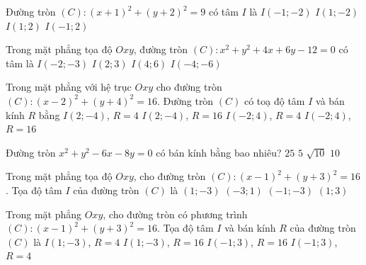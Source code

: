\begin{ex}%
	Đường  tròn $(C)\colon (x+1)^2+(y+2)^2=9$ có tâm $I$ là
	 \choice
		{\True  $I(-1;-2)$}
		 {$I(1;-2)$}
		 {$I(1; 2)$}
		{$I(-1;  2)$}
\end{ex}

\begin{ex}%
	Trong mặt phẳng tọa độ $Oxy$, đường tròn $(C) \colon x^2+y^2+4x+6y-12=0$ có tâm  là
	 \choice
		{\True  $I(-2;-3)$}
		{$I(2;3)$} 
		{$I(4;6)$} 
		 {$I(-4;-6)$}
\end{ex}

\begin{ex}%
	Trong mặt phẳng với hệ trục $Oxy$ cho đường tròn $(C)\colon  (x-2)^2 +(y+ 4)^2=16$. Đường tròn $(C)$ có toạ độ tâm $I$ và bán kính $R$ bằng
	\choice 
		 {\True $I(2;-4)$, $R=4$}
		{$I(2;-4)$, $R=16$} 
		 {$I(-2;4)$, $R=4$}
		 {$I(-2;4)$, $R=16$}
\end{ex}

\begin{ex}%
	Đường tròn $x^2+y^2-6 x-8 y=0$  có bán kính bằng bao nhiêu?
	\choice 
		{$ 25  $}
		 {\True $ 5 $}
		{$\sqrt{10}$} 
		 {$ 10 $}
\end{ex}

\begin{ex}%
	Trong mặt phẳng tọa độ $Oxy$, cho đường tròn $(C)\colon (x-1)^2+(y+3)^2=16$. Tọa độ tâm  $I$ của đường tròn $(C)$ là
	\choice 
		{\True $(1;-3)$} 
		{$(-3;1)$} 
		{$(-1;-3)$} 
		{$(1;3)$} 
\end{ex}

\begin{ex}%
	Trong mặt phẳng $Oxy$, cho  đường tròn có phương trình $(C)\colon (x-1)^2+(y+3)^2=16$. Tọa độ tâm $I$ và bán kính $R$ của đường tròn $(C)$ là
	\choice 
		{\True $I(1;-3)$,  $R=4$}
		 {$I(1;-3)$, $R=16$}
		{$I(-1;3)$, $R=16$} 
		 {$I(-1;3)$, $R=4$}
\end{ex}

